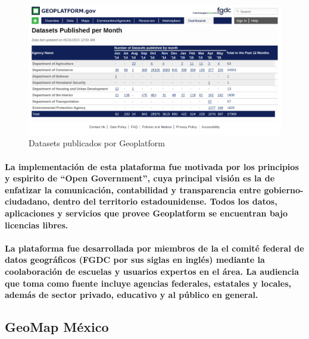   \begin{figure}[h!]
    \centering
      \includegraphics[width=\textwidth]{./images/GeoPlatform.png}
    \caption{Datasets publicados por Geoplatform}
  \end{figure}    

  \paragraph{La implementación de esta plataforma fue motivada por los principios y espirito de ``Open Government''\cite{21}, cuya principal visión es la de enfatizar la comunicación, contabilidad y transparencia entre gobierno-ciudadano, dentro del territorio estadounidense. Todos los datos, aplicaciones y servicios que provee Geoplatform se encuentran bajo licencias libres.}
  \paragraph{La plataforma fue desarrollada por miembros de la el comité federal de datos geográficos (FGDC por sus siglas en inglés) mediante la coolaboración de escuelas y usuarios expertos en el área. La audiencia que toma como fuente incluye agencias federales, estatales y locales, además de sector privado, educativo y al público en general. \cite{19}}
  \subsection{GeoMap México}
